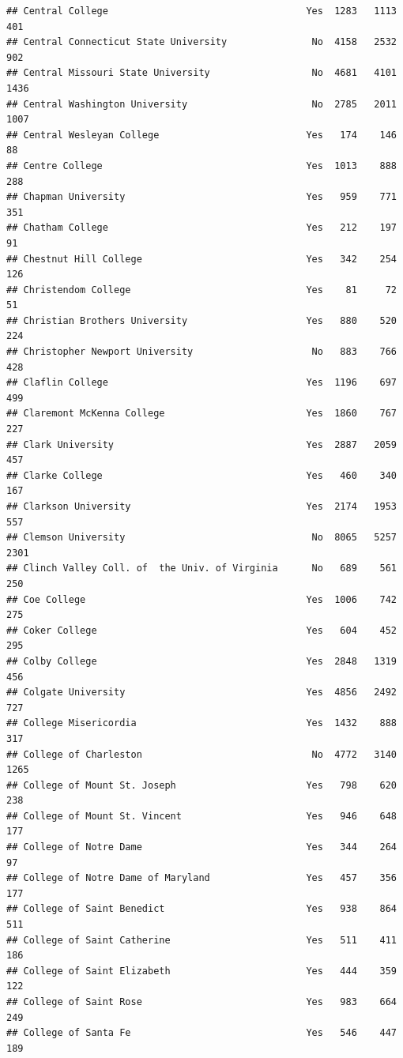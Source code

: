 \documentclass[
]{article}
\begin{document}
\begin{verbatim}
## Central College                                   Yes  1283   1113    401
## Central Connecticut State University               No  4158   2532    902
## Central Missouri State University                  No  4681   4101   1436
## Central Washington University                      No  2785   2011   1007
## Central Wesleyan College                          Yes   174    146     88
## Centre College                                    Yes  1013    888    288
## Chapman University                                Yes   959    771    351
## Chatham College                                   Yes   212    197     91
## Chestnut Hill College                             Yes   342    254    126
## Christendom College                               Yes    81     72     51
## Christian Brothers University                     Yes   880    520    224
## Christopher Newport University                     No   883    766    428
## Claflin College                                   Yes  1196    697    499
## Claremont McKenna College                         Yes  1860    767    227
## Clark University                                  Yes  2887   2059    457
## Clarke College                                    Yes   460    340    167
## Clarkson University                               Yes  2174   1953    557
## Clemson University                                 No  8065   5257   2301
## Clinch Valley Coll. of  the Univ. of Virginia      No   689    561    250
## Coe College                                       Yes  1006    742    275
## Coker College                                     Yes   604    452    295
## Colby College                                     Yes  2848   1319    456
## Colgate University                                Yes  4856   2492    727
## College Misericordia                              Yes  1432    888    317
## College of Charleston                              No  4772   3140   1265
## College of Mount St. Joseph                       Yes   798    620    238
## College of Mount St. Vincent                      Yes   946    648    177
## College of Notre Dame                             Yes   344    264     97
## College of Notre Dame of Maryland                 Yes   457    356    177
## College of Saint Benedict                         Yes   938    864    511
## College of Saint Catherine                        Yes   511    411    186
## College of Saint Elizabeth                        Yes   444    359    122
## College of Saint Rose                             Yes   983    664    249
## College of Santa Fe                               Yes   546    447    189

\end{verbatim}
\end{document}
